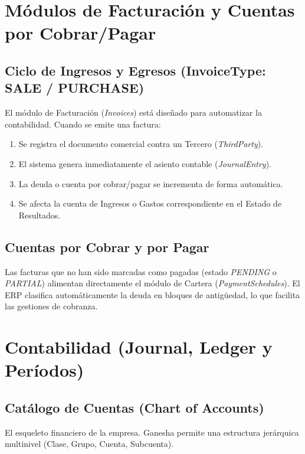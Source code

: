 \documentclass[12pt, a4paper, oneside]{book}
\begin{document}
\chapter{Módulos de Facturación y Cuentas por Cobrar/Pagar}

\section{Ciclo de Ingresos y Egresos (InvoiceType: SALE / PURCHASE)}
El módulo de Facturación (\textit{Invoices}) está diseñado para automatizar la contabilidad. Cuando se emite una factura:
\begin{enumerate}
    \item Se registra el documento comercial contra un Tercero (\textit{ThirdParty}).
    \item El sistema genera inmediatamente el asiento contable (\textit{JournalEntry}).
    \item La deuda o cuenta por cobrar/pagar se incrementa de forma automática.
    \item Se afecta la cuenta de Ingresos o Gastos correspondiente en el Estado de Resultados.
\end{enumerate}

\section{Cuentas por Cobrar y por Pagar}
Las facturas que no han sido marcadas como pagadas (estado \textit{PENDING} o \textit{PARTIAL}) alimentan directamente el módulo de Cartera (\textit{PaymentSchedules}). El ERP clasifica automáticamente la deuda en bloques de antigüedad, lo que facilita las gestiones de cobranza.

\chapter{Contabilidad (Journal, Ledger y Períodos)}

\section{Catálogo de Cuentas (Chart of Accounts)}
El esqueleto financiero de la empresa. Ganesha permite una estructura jerárquica multinivel (Clase, Grupo, Cuenta, Subcuenta). 
\end{document}
